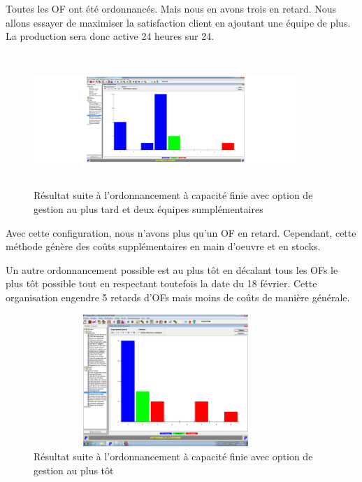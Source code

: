 \documentclass{scrreprt}
\begin{document}
Toutes les OF ont été ordonnancés. Mais nous en avons trois en retard. Nous allons essayer de maximiser la satisfaction client en ajoutant une équipe de plus. La production sera donc active 24 heures sur 24.

\begin{figure}[!h]
\centering
\includegraphics[width=10cm, height=5cm]{2equipeenplus.png}
\caption{Résultat suite à l'ordonnancement à capacité finie avec option de gestion au plus tard et deux équipes sumplémentaires}
\end{figure}

Avec cette configuration, nous n'avons plus qu'un OF en retard. Cependant, cette méthode génère des coûts supplémentaires en main d'oeuvre et en stocks.

Un autre ordonnancement possible est au plus tôt en décalant tous les OFs le plus tôt possible tout en respectant toutefois la date du 18 février. Cette organisation engendre 5 retards d'OFs mais moins de coûts de manière générale.

 \begin{figure}[!h]
\centering
\includegraphics[width=10cm, height=5cm]{auPlusTotLancement.png}
\caption{Résultat suite à l'ordonnancement à capacité finie avec option de gestion au plus tôt}
\end{figure}
\end{document}
